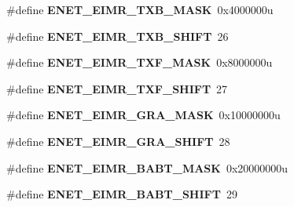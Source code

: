\begin{DoxyCompactItemize}
\item 
\hypertarget{group___e_n_e_t___register___masks_ga9fddede3e716f3928faff0eb39509275}{}\#define {\bfseries E\+N\+E\+T\+\_\+\+E\+I\+M\+R\+\_\+\+T\+X\+B\+\_\+\+M\+A\+S\+K}~0x4000000u\label{group___e_n_e_t___register___masks_ga9fddede3e716f3928faff0eb39509275}

\item 
\hypertarget{group___e_n_e_t___register___masks_gac105b6e74a6dea995d1aba52557c6652}{}\#define {\bfseries E\+N\+E\+T\+\_\+\+E\+I\+M\+R\+\_\+\+T\+X\+B\+\_\+\+S\+H\+I\+F\+T}~26\label{group___e_n_e_t___register___masks_gac105b6e74a6dea995d1aba52557c6652}

\item 
\hypertarget{group___e_n_e_t___register___masks_ga82cff30c63a5da6e1c8f258ec2ba58b6}{}\#define {\bfseries E\+N\+E\+T\+\_\+\+E\+I\+M\+R\+\_\+\+T\+X\+F\+\_\+\+M\+A\+S\+K}~0x8000000u\label{group___e_n_e_t___register___masks_ga82cff30c63a5da6e1c8f258ec2ba58b6}

\item 
\hypertarget{group___e_n_e_t___register___masks_gab7b9fcb8d862613d25705d25cde3bc2d}{}\#define {\bfseries E\+N\+E\+T\+\_\+\+E\+I\+M\+R\+\_\+\+T\+X\+F\+\_\+\+S\+H\+I\+F\+T}~27\label{group___e_n_e_t___register___masks_gab7b9fcb8d862613d25705d25cde3bc2d}

\item 
\hypertarget{group___e_n_e_t___register___masks_gab98df36a19739e86d31288f174b02808}{}\#define {\bfseries E\+N\+E\+T\+\_\+\+E\+I\+M\+R\+\_\+\+G\+R\+A\+\_\+\+M\+A\+S\+K}~0x10000000u\label{group___e_n_e_t___register___masks_gab98df36a19739e86d31288f174b02808}

\item 
\hypertarget{group___e_n_e_t___register___masks_gaf521660efa515ae8165bfae1239c623d}{}\#define {\bfseries E\+N\+E\+T\+\_\+\+E\+I\+M\+R\+\_\+\+G\+R\+A\+\_\+\+S\+H\+I\+F\+T}~28\label{group___e_n_e_t___register___masks_gaf521660efa515ae8165bfae1239c623d}

\item 
\hypertarget{group___e_n_e_t___register___masks_gae9646ae2a082e18adeb6a1c2e654a821}{}\#define {\bfseries E\+N\+E\+T\+\_\+\+E\+I\+M\+R\+\_\+\+B\+A\+B\+T\+\_\+\+M\+A\+S\+K}~0x20000000u\label{group___e_n_e_t___register___masks_gae9646ae2a082e18adeb6a1c2e654a821}

\item 
\hypertarget{group___e_n_e_t___register___masks_gad0fc34be1abc0e6059feb0ac0f7e7db1}{}\#define {\bfseries E\+N\+E\+T\+\_\+\+E\+I\+M\+R\+\_\+\+B\+A\+B\+T\+\_\+\+S\+H\+I\+F\+T}~29\label{group___e_n_e_t___register___masks_gad0fc34be1abc0e6059feb0ac0f7e7db1}


\end{DoxyCompactItemize}
